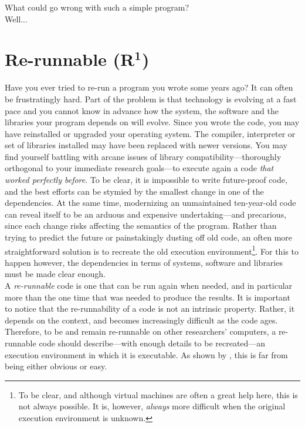 \documentclass[a4paper,11pt]{article}
\begin{document}
What could go wrong with such a simple program?\\
\vfill
Well...
\vfill


\clearpage
\section*{Re-runnable (R$^{\mathbf 1}$)}

Have you ever tried to re-run a program you wrote some years ago? It can often be frustratingly hard. Part of the problem is that technology is evolving at a fast pace and you cannot know in advance how the system, the software and the libraries your program depends on will evolve. Since you wrote the code, you may have reinstalled or upgraded  your operating system. The compiler, interpreter or set of libraries installed may have been replaced with newer versions. You may find yourself battling with arcane issues of library compatibility---thoroughly orthogonal to your immediate research  goals---to execute again a code \emph{that worked perfectly before}. To be clear, it is impossible to write future-proof code, and the best efforts can be stymied by the smallest change in one of the dependencies. At the same time, modernizing an unmaintained ten-year-old code can reveal itself to be an arduous and expensive undertaking---and precarious, since each change risks affecting the semantics of the program. Rather than trying to predict the future or painstakingly dusting off old code, an often more straightforward solution is to recreate the old execution environment\footnote{To be clear, and although virtual machines are often a great help here, this is not always possible. It is, however, \emph{always} more difficult when the original execution environment is unknown.}. For this to happen however, the dependencies in terms of systems, software and libraries must be made clear enough.\\

A \emph{re-runnable} code is one that can be run again when needed, and in particular more than the one time that was needed to produce the results. It is important to notice that the re-runnability of a code is not an intrinsic property. Rather, it depends on the context, and becomes increasingly difficult as the code ages. Therefore, to be and remain re-runnable on other researchers' computers, a re-runnable code should describe---with enough details to be recreated---an execution environment in which it is executable. As shown by \citep{Collberg:2016}, this is far from being either obvious or easy.\\
\end{document}
